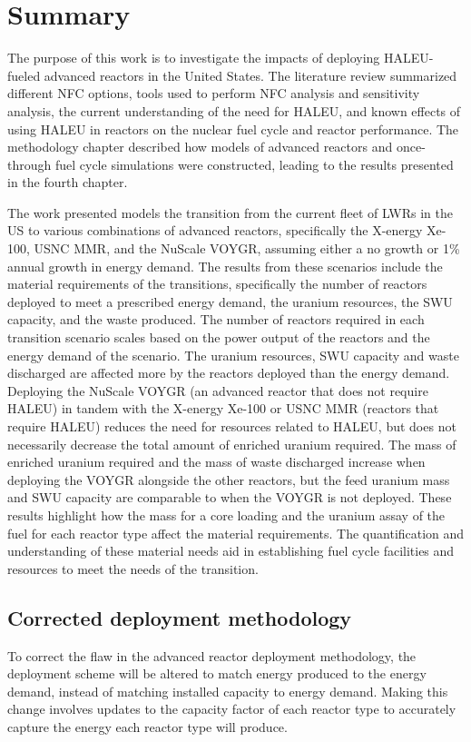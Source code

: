 \section{Summary}
The purpose of this work is to investigate the impacts of 
deploying \gls{HALEU}-fueled advanced reactors in the United States. 
The literature 
review summarized different \gls{NFC} options, tools used to perform 
\gls{NFC} analysis and sensitivity analysis, 
the current understanding of the need for \gls{HALEU}, and known 
effects of using \gls{HALEU} in reactors on the nuclear fuel cycle 
and reactor performance. The methodology chapter 
described how models of advanced reactors and once-through fuel cycle 
simulations were constructed, leading to the results presented in the 
fourth chapter. 

The work presented models the transition from the current fleet of 
\glspl{LWR} in the US to various combinations of advanced reactors, 
specifically the X-energy Xe-100, \gls{USNC} \gls{MMR}, and the 
NuScale VOYGR, assuming either a no growth or 1\% annual growth in 
energy demand. The results from these scenarios include the material 
requirements of the transitions, specifically the number of reactors 
deployed to meet a prescribed energy demand, the 
uranium resources, the \gls{SWU} 
capacity, and the waste produced. The number of reactors required 
in each transition scenario scales based on the power output of the 
reactors and the energy demand of the scenario. The uranium resources, 
\gls{SWU} capacity and waste discharged are 
affected more by the reactors deployed than the energy demand. Deploying 
the 
NuScale VOYGR (an advanced reactor that does not require \gls{HALEU}) 
in tandem with the X-energy Xe-100 or \gls{USNC} \gls{MMR} (reactors 
that require \gls{HALEU}) reduces the need for resources related to 
\gls{HALEU}, but does not necessarily decrease the total amount of 
enriched uranium required. 
The mass of enriched uranium required and the mass of waste discharged 
increase when deploying the VOYGR alongside the other reactors, but the 
feed uranium mass and \gls{SWU} capacity are comparable to when the VOYGR 
is not deployed. These results 
highlight how the mass for a core loading and the 
uranium assay of the fuel for each reactor type affect the material 
requirements. The 
quantification and understanding of these material needs aid in 
establishing fuel cycle facilities and resources to meet the needs of 
the transition. 

\subsection{Corrected deployment methodology}
To correct the flaw in the advanced reactor deployment methodology, 
the deployment scheme 
will be altered to match energy produced to the energy demand, instead 
of matching installed capacity to energy demand. Making this change 
involves updates to the capacity factor of each reactor type to 
accurately capture the energy each reactor type will produce. 

